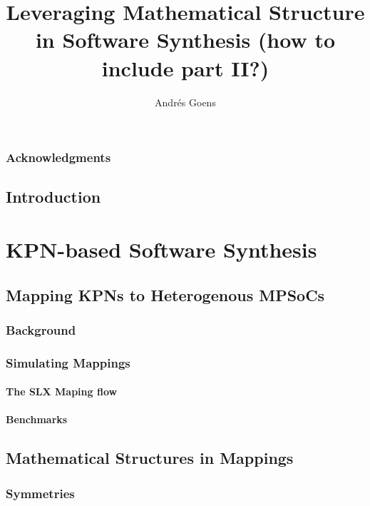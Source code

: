 \documentclass{report}
\title{Leveraging Mathematical Structure in Software Synthesis (how to include part II?)}
\author{Andr\'{e}s Goens}
\begin{document}

\date{}

\maketitle
\tableofcontents
\clearpage
\section*{Acknowledgments}


\chapter{Introduction}


\part{KPN-based Software Synthesis}

\chapter{Mapping KPNs to Heterogenous MPSoCs}

\section{Background}

\section{Simulating Mappings}

\subsection{The SLX Maping flow}

\subsection{Benchmarks}


\chapter{Mathematical Structures in Mappings}

\section{Symmetries}
\end{document}
